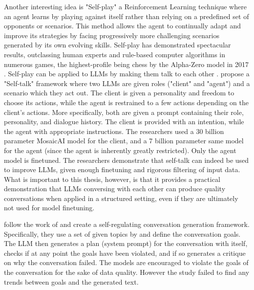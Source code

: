 Another interesting idea is "Self-play" a Reinforcement Learning technique where an agent learns by playing against itself rather than relying on a predefined set of opponents or scenarios. This method allows the agent to continually adapt and improve its strategies by facing progressively more challenging scenarios generated by its own evolving skills. Self-play has demonstrated spectacular results, outclassing human experts and rule-based computer algorithms in numerous games, the highest-profile being chess by the Alpha-Zero model in 2017 \cite{silver2017masteringchessshogiselfplay}. Self-play can be applied to LLMs by making them talk to each other \cite{cheng2024selfplayingadversariallanguagegame}.  \cite{ulmer2024bootstrappingllmbasedtaskorienteddialogue} propose a "Self-talk" framework where two LLMs are given roles ("client" and "agent") and a scenario which they act out. The client is given a personality and freedom to choose its actions, while the agent is restrained to a few actions depending on the client's actions. More specifically, both are given a prompt containing their role, personality, and dialogue history. The client is provided with an intention, while the agent with appropriate instructions. The researchers used a 30 billion parameter MosaicAI \cite{MosaicML2023} model for the client, and a 7 billion parameter same model for the agent (since the agent is inherently greatly restricted). Only the agent model is finetuned. The researchers demonstrate that self-talk can indeed be used to improve LLMs, given enough finetuning and rigorous filtering of input data. What is important to this thesis, however, is that it provides a practical demonstration that LLMs conversing with each other can produce quality conversations when applied in a structured setting, even if they are ultimately not used for model finetuning.


\cite{lambert2024selfdirectedsyntheticdialoguesrevisions} follow the work of \cite{Bai2022ConstitutionalAH} and create a self-regulating conversation generation framework. Specifically, they use a set of given topics by \cite{Castricato2024SuppressingPE} and define the conversation goals. The LLM then generates a plan (system prompt) for the conversation with itself, checks if at any point the goals have been violated, and if so generates a critique on why the conversation failed. The models are encouraged to violate the goals of the conversation for the sake of data quality. However the study failed to find any trends between goals and the generated text.

